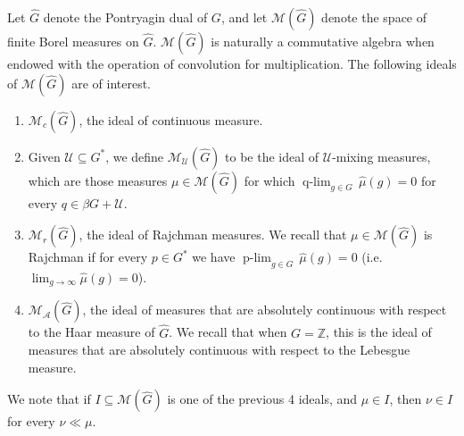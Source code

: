 \documentclass[graybox]{svmult}
\theoremstyle{definition}
\newcommand{\plimgG}[3]{\mathop {#1\text{-lim}}_{#2\in #3}\,}
\begin{document}
Let $\widehat{G}$ denote the Pontryagin dual of $G$, and let $\mathcal{M}(\widehat{G})$ denote the space of finite Borel measures on $\widehat{G}$.
$\mathcal{M}(\widehat{G})$ is naturally a commutative algebra when endowed with the operation of convolution for multiplication.
The following ideals of $\mathcal{M}(\widehat{G})$ are of interest.
\begin{enumerate}
    \item $\mathcal{M}_c(\widehat{G})$, the ideal of continuous measure.

    \item Given $\mathcal{U} \subseteq G^*$, we define $\mathcal{M}_\mathcal{U}(\widehat{G})$ to be the ideal of $\mathcal{U}$-mixing measures, which are those measures $\mu \in \mathcal{M}(\widehat{G})$ for which $\plimgG{q}{g}{G}\widehat{\mu}(g) = 0$ for every $q \in \beta G+\mathcal{U}$.

    \item $\mathcal{M}_r(\widehat{G})$, the ideal of Rajchman measures. 
    We recall that $\mu \in \mathcal{M}(\widehat{G})$ is Rajchman if for every $p \in G^*$ we have $\plimgG{p}{g}{G}\widehat{\mu}(g) = 0$ (i.e. $\lim_{g\rightarrow\infty}\widehat{\mu}(g) = 0$).

    \item $\mathcal{M}_\mathcal{A}(\widehat{G})$, the ideal of measures that are absolutely continuous with respect to the Haar measure of $\widehat{G}$.
    We recall that when $G = \mathbb{Z}$, this is the ideal of measures that are absolutely continuous with respect to the Lebesgue measure.
\end{enumerate}
We note that if $I \subseteq \mathcal{M}(\widehat{G})$ is one of the previous 4 ideals, and $\mu \in I$, then $\nu \in I$ for every $\nu \ll \mu$.
\end{document}
